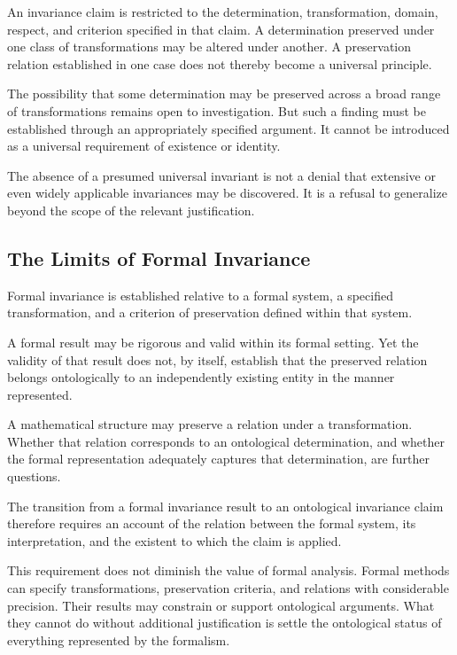 An invariance claim is restricted to the determination,
transformation, domain, respect, and criterion specified
in that claim. A determination preserved under one class
of transformations may be altered under another. A
preservation relation established in one case does not
thereby become a universal principle.

The possibility that some determination may be preserved
across a broad range of transformations remains open
to investigation. But such a finding must be established
through an appropriately specified argument. It cannot
be introduced as a universal requirement of existence
or identity.

The absence of a presumed universal invariant is not
a denial that extensive or even widely applicable
invariances may be discovered. It is a refusal to
generalize beyond the scope of the relevant justification.

\subsection{The Limits of Formal Invariance}

Formal invariance is established relative to a formal
system, a specified transformation, and a criterion
of preservation defined within that system.

A formal result may be rigorous and valid within its
formal setting. Yet the validity of that result does
not, by itself, establish that the preserved relation
belongs ontologically to an independently existing
entity in the manner represented.

A mathematical structure may preserve a relation under
a transformation. Whether that relation corresponds
to an ontological determination, and whether the formal
representation adequately captures that determination,
are further questions.

The transition from a formal invariance result to an
ontological invariance claim therefore requires an
account of the relation between the formal system,
its interpretation, and the existent to which the
claim is applied.

This requirement does not diminish the value of
formal analysis. Formal methods can specify transformations,
preservation criteria, and relations with considerable
precision. Their results may constrain or support
ontological arguments. What they cannot do without
additional justification is settle the ontological
status of everything represented by the formalism.

